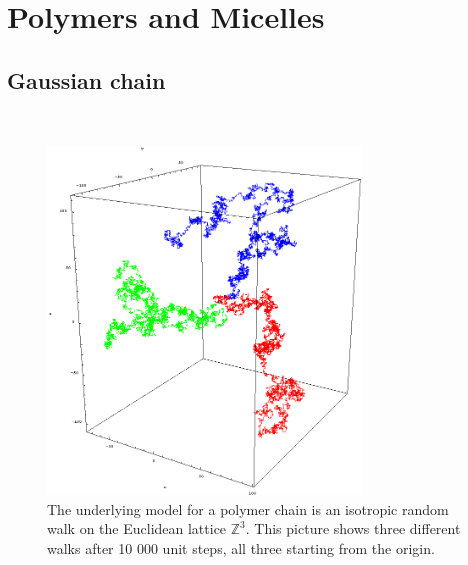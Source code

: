 \section{Polymers and Micelles}
\label{sect:Polymers_Micelles}

\subsection{Gaussian chain}
\label{sect:GaussCoil}
~\\

\begin{figure}[htb]
\begin{center}
\includegraphics[width=0.744\textwidth]{Walk3d_0.png}
\end{center}
\caption{The underlying model for a polymer chain is an
isotropic random walk on the Euclidean lattice $\mathbb{Z}^3$.
This picture shows three different walks after 10 000 unit steps,
all three starting from the origin. \label{fig:RandomWalk3D}}
\end{figure}

